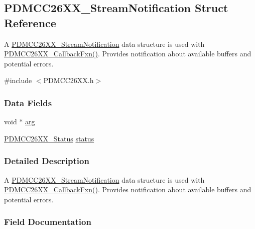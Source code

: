 \subsection{P\+D\+M\+C\+C26\+X\+X\+\_\+\+Stream\+Notification Struct Reference}
\label{struct_p_d_m_c_c26_x_x___stream_notification}


A \hyperlink{struct_p_d_m_c_c26_x_x___stream_notification}{P\+D\+M\+C\+C26\+X\+X\+\_\+\+Stream\+Notification} data structure is used with \hyperlink{_p_d_m_c_c26_x_x_8h_ab6fdee59a79029e938e3fbf0e446fa91}{P\+D\+M\+C\+C26\+X\+X\+\_\+\+Callback\+Fxn()}. Provides notification about available buffers and potential errors.  




{\ttfamily \#include $<$P\+D\+M\+C\+C26\+X\+X.\+h$>$}

\subsubsection*{Data Fields}
\begin{DoxyCompactItemize}
\item 
void $\ast$ \hyperlink{struct_p_d_m_c_c26_x_x___stream_notification_ab21bcd11c6d72c08354643d6022cbb5e}{arg}
\item 
\hyperlink{_p_d_m_c_c26_x_x_8h_afbfe993e790be75708df00186070a779}{P\+D\+M\+C\+C26\+X\+X\+\_\+\+Status} \hyperlink{struct_p_d_m_c_c26_x_x___stream_notification_a57a4fc3f0b7fc1ff267b164cafff063c}{status}
\end{DoxyCompactItemize}


\subsubsection{Detailed Description}
A \hyperlink{struct_p_d_m_c_c26_x_x___stream_notification}{P\+D\+M\+C\+C26\+X\+X\+\_\+\+Stream\+Notification} data structure is used with \hyperlink{_p_d_m_c_c26_x_x_8h_ab6fdee59a79029e938e3fbf0e446fa91}{P\+D\+M\+C\+C26\+X\+X\+\_\+\+Callback\+Fxn()}. Provides notification about available buffers and potential errors. 

\subsubsection{Field Documentation}
